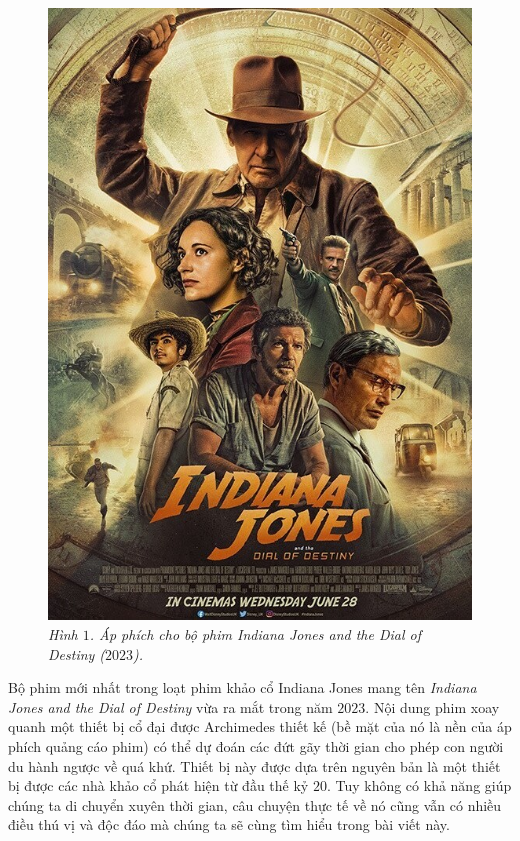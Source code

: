 \begin{multicols}{2}
	\begin{figure}[H]
		\vspace*{5pt}
		\centering
		\captionsetup{labelformat= empty, justification=centering}
		\includegraphics[width= 1\linewidth]{1}
		\caption{\small\textit{\color{lichsutoanhoc}Hình $1$. Áp phích cho bộ phim Indiana Jones and the Dial of Destiny ($2023$).}}
		\vspace*{-10pt}
	\end{figure}
	Bộ phim mới nhất trong loạt phim khảo cổ Indiana Jones mang tên \textit{Indiana Jones and the Dial of Destiny} vừa ra mắt trong năm $2023$. Nội dung phim xoay quanh một thiết bị cổ đại được Archimedes thiết kế (bề mặt của nó là nền của áp phích quảng cáo phim) có thể dự đoán các đứt gãy thời gian cho phép con người du hành ngược về quá khứ. Thiết bị này được dựa trên nguyên bản là một thiết bị được các nhà khảo cổ phát hiện từ đầu thế kỷ $20$. Tuy không có khả năng giúp chúng ta di chuyển xuyên thời gian, câu chuyện thực tế về nó cũng vẫn có nhiều điều thú vị và độc đáo mà chúng ta sẽ cùng tìm hiểu trong bài viết này.

\end{multicols}
